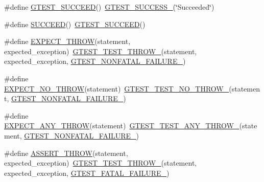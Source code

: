 \begin{DoxyCompactItemize}
\item 
\#define \hyperlink{fused-src_2gtest_2gtest_8h_a2690441c38202728f4159ac2462d9720}{G\-T\-E\-S\-T\-\_\-\-S\-U\-C\-C\-E\-E\-D}()~\hyperlink{gtest-internal_8h_abe012b550eb3807e8c49f7e161bd1567}{G\-T\-E\-S\-T\-\_\-\-S\-U\-C\-C\-E\-S\-S\-\_\-}(\char`\"{}Succeeded\char`\"{})
\item 
\#define \hyperlink{fused-src_2gtest_2gtest_8h_a75adcdf89f69b0b615e395daafc315af}{S\-U\-C\-C\-E\-E\-D}()~\hyperlink{include_2gtest_2gtest_8h_a2690441c38202728f4159ac2462d9720}{G\-T\-E\-S\-T\-\_\-\-S\-U\-C\-C\-E\-E\-D}()
\item 
\#define \hyperlink{fused-src_2gtest_2gtest_8h_a789842b4475eed948e6fd18390d5a859}{E\-X\-P\-E\-C\-T\-\_\-\-T\-H\-R\-O\-W}(statement, expected\-\_\-exception)~\hyperlink{gtest-internal_8h_a3f71db93eaf30b0cfca9612b9ac32106}{G\-T\-E\-S\-T\-\_\-\-T\-E\-S\-T\-\_\-\-T\-H\-R\-O\-W\-\_\-}(statement, expected\-\_\-exception, \hyperlink{gtest-internal_8h_a6cb7482cfa03661a91c698eb5895f642}{G\-T\-E\-S\-T\-\_\-\-N\-O\-N\-F\-A\-T\-A\-L\-\_\-\-F\-A\-I\-L\-U\-R\-E\-\_\-})
\item 
\#define \hyperlink{fused-src_2gtest_2gtest_8h_a2743a1438137ad857aa3f9fec3ff67ec}{E\-X\-P\-E\-C\-T\-\_\-\-N\-O\-\_\-\-T\-H\-R\-O\-W}(statement)~\hyperlink{gtest-internal_8h_a9a109d026b5a904646437d7570e13581}{G\-T\-E\-S\-T\-\_\-\-T\-E\-S\-T\-\_\-\-N\-O\-\_\-\-T\-H\-R\-O\-W\-\_\-}(statement, \hyperlink{gtest-internal_8h_a6cb7482cfa03661a91c698eb5895f642}{G\-T\-E\-S\-T\-\_\-\-N\-O\-N\-F\-A\-T\-A\-L\-\_\-\-F\-A\-I\-L\-U\-R\-E\-\_\-})
\item 
\#define \hyperlink{fused-src_2gtest_2gtest_8h_a9be43f44d148e8a8d6a89c864bf4e461}{E\-X\-P\-E\-C\-T\-\_\-\-A\-N\-Y\-\_\-\-T\-H\-R\-O\-W}(statement)~\hyperlink{gtest-internal_8h_af48bbd26d54d4afc5e4cef39b1c76ba3}{G\-T\-E\-S\-T\-\_\-\-T\-E\-S\-T\-\_\-\-A\-N\-Y\-\_\-\-T\-H\-R\-O\-W\-\_\-}(statement, \hyperlink{gtest-internal_8h_a6cb7482cfa03661a91c698eb5895f642}{G\-T\-E\-S\-T\-\_\-\-N\-O\-N\-F\-A\-T\-A\-L\-\_\-\-F\-A\-I\-L\-U\-R\-E\-\_\-})
\item 
\#define \hyperlink{fused-src_2gtest_2gtest_8h_aedb1eddae6c2a2430b0e7b7e03b4f052}{A\-S\-S\-E\-R\-T\-\_\-\-T\-H\-R\-O\-W}(statement, expected\-\_\-exception)~\hyperlink{gtest-internal_8h_a3f71db93eaf30b0cfca9612b9ac32106}{G\-T\-E\-S\-T\-\_\-\-T\-E\-S\-T\-\_\-\-T\-H\-R\-O\-W\-\_\-}(statement, expected\-\_\-exception, \hyperlink{gtest-internal_8h_a0f9a4c3ea82cc7bf4478eaffdc168358}{G\-T\-E\-S\-T\-\_\-\-F\-A\-T\-A\-L\-\_\-\-F\-A\-I\-L\-U\-R\-E\-\_\-})
\item 

\end{DoxyCompactItemize}

